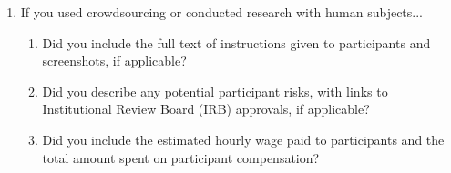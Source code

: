 \documentclass[]{article}
\begin{document}
\begin{enumerate}
\item If you used crowdsourcing or conducted research with human subjects...
\begin{enumerate}
  \item Did you include the full text of instructions given to participants and screenshots, if applicable?
    \answerNA{}
  \item Did you describe any potential participant risks, with links to Institutional Review Board (IRB) approvals, if applicable?
    \answerNA{}
  \item Did you include the estimated hourly wage paid to participants and the total amount spent on participant compensation?
    \answerNA{}
\end{enumerate}

\end{enumerate}

\end{document}

